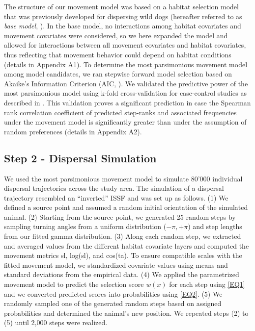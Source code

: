 \documentclass[abstract=on,10pt,a4paper,bibliography=totocnumbered]{article}
\begin{document}
The structure of our movement model was based on a habitat selection model that
was previously developed for dispersing wild dogs (hereafter referred to as
\textit{base model}, \citealp{Hofmann.2021}). In the base model, no interactions
among habitat covariates and movement covariates were considered, so we here
expanded the model and allowed for interactions between all movement covariates
and habitat covariates, thus reflecting that movement behavior could depend on
habitat conditions (details in Appendix A1). To determine the most parsimonious
movement model among model candidates, we ran stepwise forward model selection
based on Akaike's Information Criterion (AIC, \citealp{Burnham.2002}). We
validated the predictive power of the most parsimonious model using k-fold
cross-validation for case-control studies as described in \cite{Fortin.2009}.
This validation proves a significant prediction in case the Spearman rank
correlation coefficient of predicted step-ranks and associated frequencies under
the movement model is significantly greater than under the assumption of random
preferences (details in Appendix A2).

\subsection{Step 2 - Dispersal Simulation}
We used the most parsimonious movement model to simulate 80'000 individual
dispersal trajectories across the study area. The simulation of a dispersal
trajectory resembled an ``inverted'' ISSF and was set up as follows. (1) We
defined a source point and assumed a random initial orientation of the simulated
animal. (2) Starting from the source point, we generated 25 random steps by
sampling turning angles from a uniform distribution (\(-\pi, +\pi\)) and step
lengths from our fitted gamma distribution. (3) Along each random step, we
extracted and averaged values from the different habitat covariate layers and
computed the movement metrics \textsf{sl}, \textsf{log(sl)}, and
\textsf{cos(ta)}. To ensure compatible scales with the fitted movement model, we
standardized covariate values using means and standard deviations from the
empirical data. (4) We applied the parametrized movement model to predict the
selection score \(w(x)\) for each step using \ref{EQ1} and we converted
predicted scores into probabilities using \ref{EQ2}. (5) We randomly sampled one
of the generated random steps based on assigned probabilities and determined the
animal's new position. We repeated steps (2) to (5) until 2,000 steps were
realized.
\end{document}
